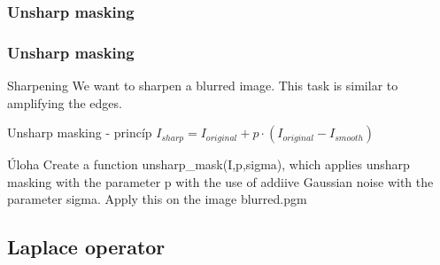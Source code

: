 \documentclass{beamer}
\begin{document}
\begin{frame}
\frametitle{Unsharp masking} 
\noindent{}
\end{frame}

\begin{frame}
\frametitle{Unsharp masking} 
  \begin{block}{Sharpening}
    We want to sharpen a blurred image. This task is similar to amplifying the edges.
  \end{block} 
 
  \begin{block}{Unsharp masking - princíp}
    $I_{sharp} = I_{original} + p \cdot \left( I_{original} - I_{smooth} \right)$
  \end{block}
  
  \begin{block}{Úloha}
  Create a function unsharp\_mask(I,p,sigma), which applies unsharp masking with the parameter p with the use of addiive Gaussian noise with the parameter sigma. Apply this on the image blurred.pgm
  \end{block}
\end{frame}

\subsection{Laplace operator}
\end{document}
